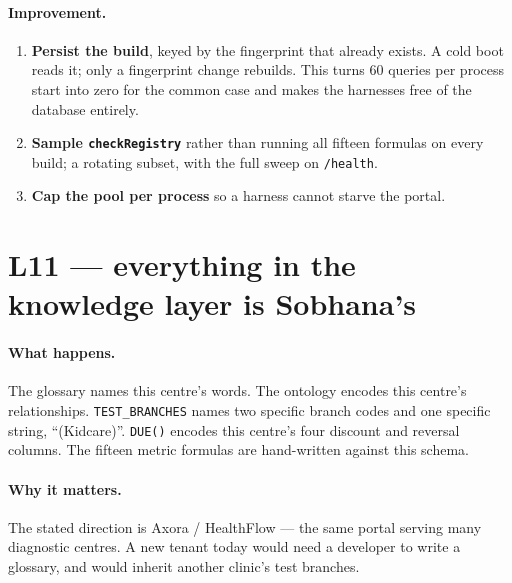 \documentclass[11pt,a4paper]{report}
\newcommand{\code}[1]{\texttt{\small #1}}
\begin{document}
\paragraph{Improvement.}
\begin{enumerate}[leftmargin=*,itemsep=1pt]
\item \textbf{Persist the build}, keyed by the fingerprint that already exists. A cold boot reads
      it; only a fingerprint change rebuilds. This turns 60 queries per process start into zero for
      the common case and makes the harnesses free of the database entirely.
\item \textbf{Sample \code{checkRegistry}} rather than running all fifteen formulas on every build;
      a rotating subset, with the full sweep on \code{/health}.
\item \textbf{Cap the pool per process} so a harness cannot starve the portal.
\end{enumerate}

\section{L11 --- everything in the knowledge layer is Sobhana's}

\paragraph{What happens.} The glossary names this centre's words. The ontology encodes this
centre's relationships. \code{TEST\_BRANCHES} names two specific branch codes and one specific
string, ``(Kidcare)''. \code{DUE()} encodes this centre's four discount and reversal columns. The
fifteen metric formulas are hand-written against this schema.

\paragraph{Why it matters.} The stated direction is Axora / HealthFlow --- the same portal serving
many diagnostic centres. A new tenant today would need a developer to write a glossary, and would
inherit another clinic's test branches.
\end{document}
